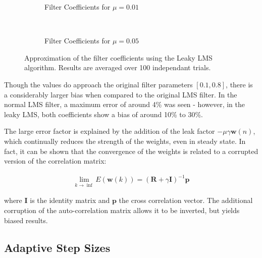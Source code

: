 \documentclass[main.tex]{subfiles}
\begin{document}
\begin{figure}[H]
	\centering
	\begin{subfigure}[b]{0.45\textwidth}
		\resizebox{\textwidth}{!}{}
		\caption{Filter Coefficients for $\mu = 0.01$}
	\end{subfigure}%
	~ %
	\begin{subfigure}[b]{0.45\textwidth}
		\resizebox{\textwidth}{!}{}
		\caption{Filter Coefficients for $\mu = 0.05$}
	\end{subfigure}
	\caption{Approximation of the filter coefficients using the Leaky LMS algorithm. Results are averaged over 100 independant trials.}
	\label{fig:animals}
\end{figure}



Though the values do approach the original filter parameters $[0.1, 0.8]$, there is a considerably larger bias when compared to the original LMS filter. In the normal LMS filter, a maximum error of around 4\% was seen - however, in the leaky LMS, both coefficients show a bias of around 10\% to 30\%.

The large error factor is explained by the addition of the leak factor $-\mu\gamma\textbf{w}(n)$, which continually reduces the strength of the weights, even in steady state. In fact, it can be shown that the convergence of the weights is related to a corrupted version of the correlation matrix\cite{Kamenetsky2004}:

\begin{align*}
\lim_{k \to \inf}E(\textbf{w}(k)) = (\textbf{R} + \gamma \textbf{I})^{-1}\textbf{p}
\end{align*}

where $\textbf{I}$ is the identity matrix and $\textbf{p}$ the cross correlation vector. The additional corruption of the auto-correlation matrix allows it to be inverted, but yields biased results.



















\subsection{Adaptive Step Sizes}
\end{document}
